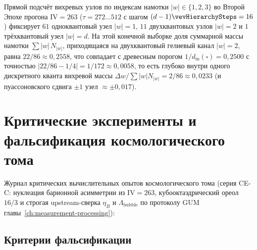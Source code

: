 \begin{enumerate}[leftmargin=*]
  Прямой подсчёт вихревых узлов по индексам намотки $|w|\in\{1,2,3\}$ во Второй Эпохе прогона $\mathrm{IV}=263$ ($\tau = 272\ldots 512$ с шагом $(d-1)\vevHierarchySteps = 16$) фиксирует $61$ одноквантовый узел $|w|=1$, $11$ двухквантовых узлов $|w|=2$ и $1$ трёхквантовый узел $|w|=d$. На этой конечной выборке доля суммарной массы намотки $\sum |w|\,N_{|w|}$, приходящаяся на двухквантовый гелиевый канал $|w|=2$, равна $22/86 \approx 0{,}2558$, что совпадает с древесным порогом $1/d_{\mathrm{in}}(\square) = 0{,}2500$ с точностью $|22/86 - 1/4| = 1/172 \approx 0{,}0058$, то есть глубоко внутри одного дискретного кванта вихревой массы $\Delta w / \sum |w|N_{|w|} = 2/86 \approx 0{,}0233$ (и пуассоновского сдвига $\pm 1$ узел $\approx \pm 0{,}017$).
\end{enumerate}





\chapter{Критические эксперименты и фальсификация космологического тома}
\label{ch:cosmo-critical-experiments}

Журнал критических вычислительных опытов космологического тома (серия CE-C: нуклеация барионной асимметрии из $\mathrm{IV}=263$, кубооктаэдрический ореол $16/3$ и строгая upstream-сверка $\eta_B$ и $\Lambda_{\mathrm{bubble}}$ по протоколу GUM главы~\ref{ch:measurement-processing}):



\section{Критерии фальсификации}
\label{sec:cosmo-falsification}

